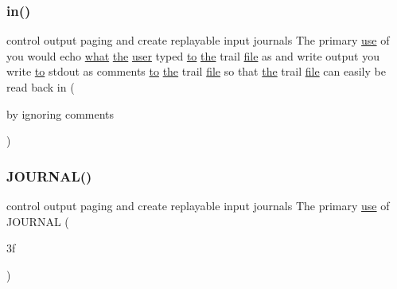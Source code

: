 \subsubsection{\texorpdfstring{in()}{in()}}
{\footnotesize\ttfamily control output paging and create replayable input journals The primary \hyperlink{intro__blas1_83_8txt_a04fa2694d85f67a675bb3f45f7241f48}{use} of you would echo \hyperlink{what__overview_81_8txt_adadc702e2a3423fa136bfa5b1e01b511}{what} \hyperlink{M__stopwatch_83_8txt_a0f266597de2e57eb3aa964927bb30e14}{the} \hyperlink{M__stopwatch_83_8txt_ae5f4c36a1ae7eba7900823c418223f72}{user} typed \hyperlink{M__stopwatch_83_8txt_a97209fd3e34ef701c0a9734280779cbb}{to} \hyperlink{M__stopwatch_83_8txt_a0f266597de2e57eb3aa964927bb30e14}{the} trail \hyperlink{what__overview_81_8txt_a447b56c526e8da30e0dc94673727ee25}{file} as and write output you write \hyperlink{M__stopwatch_83_8txt_a97209fd3e34ef701c0a9734280779cbb}{to} stdout as comments \hyperlink{M__stopwatch_83_8txt_a97209fd3e34ef701c0a9734280779cbb}{to} \hyperlink{M__stopwatch_83_8txt_a0f266597de2e57eb3aa964927bb30e14}{the} trail \hyperlink{what__overview_81_8txt_a447b56c526e8da30e0dc94673727ee25}{file} so that \hyperlink{M__stopwatch_83_8txt_a0f266597de2e57eb3aa964927bb30e14}{the} trail \hyperlink{what__overview_81_8txt_a447b56c526e8da30e0dc94673727ee25}{file} can easily be read back in (\begin{DoxyParamCaption}\item[{by ignoring}]{comments }\end{DoxyParamCaption})}

\mbox{\label{M__journal_83_8txt_aee6db01e1c6132b5b3f146b5a0c6e7e1}} 
\subsubsection{\texorpdfstring{J\+O\+U\+R\+N\+A\+L()}{JOURNAL()}}
{\footnotesize\ttfamily control output paging and create replayable input journals The primary \hyperlink{intro__blas1_83_8txt_a04fa2694d85f67a675bb3f45f7241f48}{use} of J\+O\+U\+R\+N\+AL (\begin{DoxyParamCaption}\item[{3f}]{ }\end{DoxyParamCaption})}

\mbox{\label{M__journal_83_8txt_afbce2a0c3f8261fe1c9d79376919174e}} 
